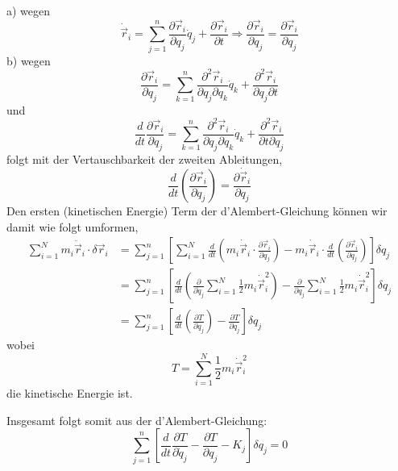 \documentclass[10pt, letterpaper]{article}
\begin{document}
a) wegen 
$$\dot{\vec{r}}_i = \sum_{j=1}^n \frac{\partial\vec{r}_i}{\partial q_j} \dot{q}_j + \frac{\partial\vec{r}_i}{\partial t} \Rightarrow \frac{\partial\vec{r}_i}{\partial q_j} = \frac{\partial\vec{r}_i}{\partial q_j}$$
b) wegen 
$$\frac{\partial\vec{r}_i}{\partial q_j} = \sum_{k=1}^n \frac{\partial^2\vec{r}_i}{\partial q_j\partial q_k} \dot{q}_k + \frac{\partial^2\vec{r}_i}{\partial q_j\partial t}$$
und 
$$\frac{d}{dt} \frac{\partial\vec{r}_i}{\partial q_j} = \sum_{k=1}^n \frac{\partial^2\vec{r}_i}{\partial q_j\partial q_k} \dot{q}_k + \frac{\partial^2\vec{r}_i}{\partial t\partial q_j}$$
folgt mit der Vertauschbarkeit der zweiten Ableitungen,
$$\frac{d}{dt} \left(\frac{\partial\vec{r}_i}{\partial q_j}\right) = \frac{\partial \dot{\vec{r}}_i}{\partial q_j}$$ 
Den ersten (kinetischen Energie) Term der d'Alembert-Gleichung können wir damit wie folgt umformen,
\begin{align*}
\sum_{i=1}^N m_i\ddot{\vec{r}}_i \cdot \delta\vec{r}_i 
&= \sum_{j=1}^n \left[ \sum_{i=1}^N \frac{d}{dt} \left( m_i \dot{\vec{r}}_i \cdot \frac{\partial \vec{r}_i}{\partial q_j} \right)
  - m_i \dot{\vec{r}}_i \cdot \frac{d}{dt} \left( \frac{\partial \vec{r}_i}{\partial q_j} \right) \right] \delta q_j \\
&= \sum_{j=1}^n \left[ \frac{d}{dt} \left( \frac{\partial}{\partial \dot{q}_j} \sum_{i=1}^N \frac{1}{2} m_i \dot{\vec{r}}_i^2 \right)
  - \frac{\partial}{\partial q_j} \sum_{i=1}^N \frac{1}{2} m_i \dot{\vec{r}}_i^2 \right] \delta q_j \\
&= \sum_{j=1}^n \left[ \frac{d}{dt} \left( \frac{\partial T}{\partial \dot{q}_j} \right) - \frac{\partial T}{\partial q_j} \right] \delta q_j
\end{align*}
wobei $$T = \sum_{i=1}^N \frac{1}{2}m_i\dot{\vec{r}}_i^2$$ 
die kinetische Energie ist.

Insgesamt folgt somit aus der d'Alembert-Gleichung:
$$\sum_{j=1}^n \left[\frac{d}{dt} \frac{\partial T}{\partial \dot{q}_j} - \frac{\partial T}{\partial q_j} - K_j\right] \delta q_j = 0$$
\end{document}
